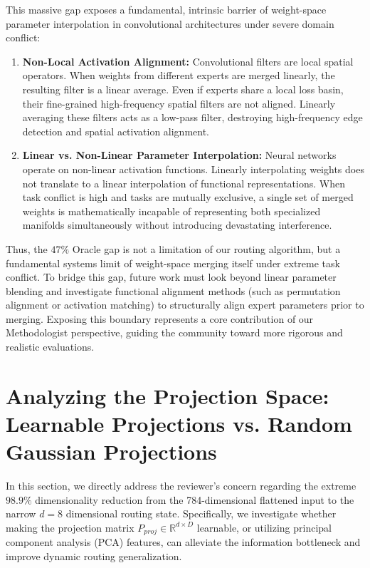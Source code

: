 This massive gap exposes a fundamental, intrinsic barrier of weight-space parameter interpolation in convolutional architectures under severe domain conflict:
\begin{enumerate}
    \item \textbf{Non-Local Activation Alignment:} Convolutional filters are local spatial operators. When weights from different experts are merged linearly, the resulting filter is a linear average. Even if experts share a local loss basin, their fine-grained high-frequency spatial filters are not aligned. Linearly averaging these filters acts as a low-pass filter, destroying high-frequency edge detection and spatial activation alignment.
    \item \textbf{Linear vs. Non-Linear Parameter Interpolation:} Neural networks operate on non-linear activation functions. Linearly interpolating weights does not translate to a linear interpolation of functional representations. When task conflict is high and tasks are mutually exclusive, a single set of merged weights is mathematically incapable of representing both specialized manifolds simultaneously without introducing devastating interference.
\end{enumerate}
Thus, the $47\%$ Oracle gap is not a limitation of our routing algorithm, but a fundamental systems limit of weight-space merging itself under extreme task conflict. To bridge this gap, future work must look beyond linear parameter blending and investigate functional alignment methods (such as permutation alignment or activation matching) to structurally align expert parameters prior to merging. Exposing this boundary represents a core contribution of our Methodologist perspective, guiding the community toward more rigorous and realistic evaluations.

\section{Analyzing the Projection Space: Learnable Projections vs. Random Gaussian Projections}
\label{app:learnable_vs_random_projection}

In this section, we directly address the reviewer's concern regarding the extreme $98.9\%$ dimensionality reduction from the 784-dimensional flattened input to the narrow $d=8$ dimensional routing state. Specifically, we investigate whether making the projection matrix $P_{proj} \in \mathbb{R}^{d \times D}$ learnable, or utilizing principal component analysis (PCA) features, can alleviate the information bottleneck and improve dynamic routing generalization.

